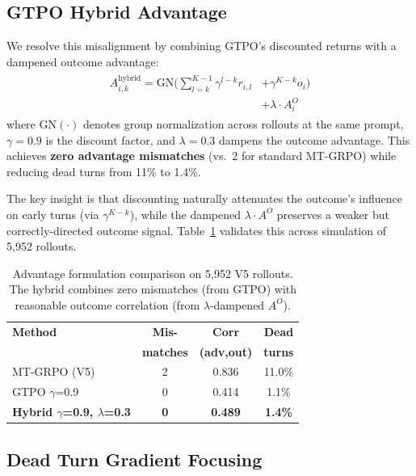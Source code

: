 \documentclass[11pt]{article}
\begin{document}
\subsection{GTPO Hybrid Advantage}

We resolve this misalignment by combining GTPO's discounted returns with a dampened outcome advantage:
\begin{eqnarray}
\begin{split}
\label{eq:gtpo}
A_{i,k}^{\text{hybrid}} = \text{GN}\Big(\sum_{l=k}^{K-1} \gamma^{l-k} r_{i,l} &+ \gamma^{K-k} o_i\Big) \\ &+ \lambda \cdot A^O_i
\end{split}
\end{eqnarray}
where $\text{GN}(\cdot)$ denotes group normalization across rollouts at the same prompt, $\gamma = 0.9$ is the discount factor, and $\lambda = 0.3$ dampens the outcome advantage. This achieves \textbf{zero advantage mismatches} (vs.\ 2 for standard MT-GRPO) while reducing dead turns from 11\% to 1.4\%.

The key insight is that discounting naturally attenuates the outcome's influence on early turns (via $\gamma^{K-k}$), while the dampened $\lambda \cdot A^O$ preserves a weaker but correctly-directed outcome signal. Table~\ref{tab:gtpo_comparison} validates this across simulation of 5,952 rollouts.

\begin{table}[t]
\centering
\small
\begin{tabular}{lccc}
\toprule
\textbf{Method} & \textbf{Mis-} & \textbf{Corr} & \textbf{Dead} \\
 & \textbf{matches} & \textbf{(adv,out)} & \textbf{turns} \\
\midrule
MT-GRPO (V5) & 2 & 0.836 & 11.0\% \\
GTPO $\gamma$=0.9 & 0 & 0.414 & 1.1\% \\
\textbf{Hybrid $\gamma$=0.9, $\lambda$=0.3} & \textbf{0} & \textbf{0.489} & \textbf{1.4\%} \\
\bottomrule
\end{tabular}
\caption{Advantage formulation comparison on 5,952 V5 rollouts. The hybrid combines zero mismatches (from GTPO) with reasonable outcome correlation (from $\lambda$-dampened $A^O$).}
\label{tab:gtpo_comparison}
\end{table}

\subsection{Dead Turn Gradient Focusing}
\end{document}
